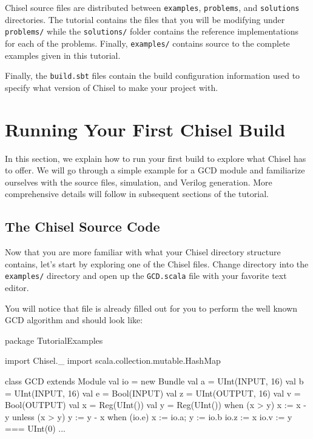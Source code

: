 \documentclass[twocolumn, 10pt]{article}
\begin{document}
Chisel source files are distributed between \verb+examples+, \verb+problems+, and \verb+solutions+ directories.
The tutorial contains the files that you will be modifying under \verb+problems/+ while the \verb+solutions/+ folder contains the reference implementations for each of the problems.  Finally, \verb+examples/+ contains source to the complete examples given in this tutorial.

Finally, the \verb+build.sbt+ files contain the build configuration information used to specify what version of Chisel to make your project with.

\section{Running Your First Chisel Build}

In this section, we explain how to run your first build to explore what Chisel has to offer. We will go through a simple example for a GCD module and familiarize ourselves with the source files, simulation, and Verilog generation. More comprehensive details will follow in subsequent sections of the tutorial.

\subsection{The Chisel Source Code}

Now that you are more familiar with what your Chisel directory structure contains, let's start by exploring one of the Chisel files. Change directory into the \verb+examples/+ directory and open up the \verb+GCD.scala+ file with your favorite text editor. 

You will notice that file is already filled out for you to perform the well known GCD algorithm and should look like:

\begin{scala}
package TutorialExamples

import Chisel._
import scala.collection.mutable.HashMap

class GCD extends Module {
  val io = new Bundle {
    val a  = UInt(INPUT,  16)
    val b  = UInt(INPUT,  16)
    val e  = Bool(INPUT)
    val z  = UInt(OUTPUT, 16)
    val v  = Bool(OUTPUT)
  }
  val x  = Reg(UInt())
  val y  = Reg(UInt())
  when   (x > y) { x := x - y } 
  unless (x > y) { y := y - x }
  when (io.e) { x := io.a; y := io.b }
  io.z := x
  io.v := y === UInt(0)
} ...
\end{scala}
\end{document}
